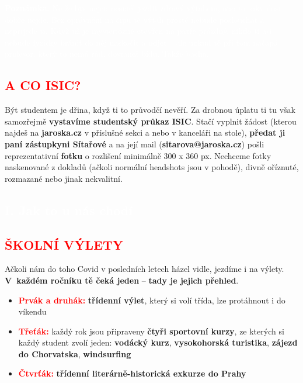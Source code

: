 \documentclass[a5paper, twoside]{article}
\newcommand{\polonadpis}[4]{
  \vspace*{-50pt}
  \begin{tcolorbox}[colback = #2, boxrule = 0pt, grow to left by = #4,  grow to right by = #4, arc=8pt, height = 30pt]
    \vspace*{5pt}
    \centering \subsection*{\textcolor{#3}{#1}}
  \end{tcolorbox}
}
\newcommand{\podnadpis}[2]{
  \subsection*{\textcolor{#2}{#1}}
}
\begin{document}
\begin{redbox}
	\textcolor{white}{\textbf{Poznámka.} Ne že bys nejen nesměl jezdit zdravý výtahem, ono to taky dost dobře nejde. Bez oprávnění na čipu tě výtah prostě nebude poslouchat a nepřijede ti. Když už je mysteriózně otevřen na patře prázdný, nikdo ti asi nebude fyzicky bránit do něj naskočit a odjet – ale pokud tě při tom načapá profesor, který to nemá rád, dostaneš bídu. Takže bacha.}
\end{redbox}

\podnadpis{A CO ISIC?}{red}
Být studentem je dřina, když ti to průvodčí nevěří. Za drobnou úplatu ti tu však samozřejmě \textbf{vystavíme studentský průkaz ISIC}. Stačí vyplnit žádost (kterou najdeš na {\bf jaroska.cz} v příslušné sekci a nebo v kanceláři na stole), \textbf{předat ji paní zástupkyni Sítařové} a na její mail (\textbf{sitarova@jaroska.cz}) pošli reprezentativní \textbf{fotku} o rozlišení minimálně 300 x 360 px. Nechceme fotky naskenované z dokladů (ačkoli normální headshots jsou v pohodě), divně oříznuté, rozmazané nebo jinak
nekvalitní.

\newpage

\polonadpis{I. Jak to u nás chodí}{red}{white}{-4.1cm}

\podnadpis{ŠKOLNÍ VÝLETY}{red}
Ačkoli nám do toho Covid v posledních letech házel vidle, jezdíme i na výlety.
\textbf{V~každém ročníku tě čeká jeden} -- \textbf{tady je jejich přehled}.

\begin{itemize}[leftmargin=10pt]
	\item \textcolor{red}{\textbf{Prvák a druhák:}} \textbf{třídenní výlet}, který si volí třída, lze protáhnout i do víkendu
	\item \textcolor{red}{\textbf{Třeťák:}} každý rok jsou připraveny \textbf{čtyři sportovní kurzy}, ze kterých si každý student zvolí jeden: \textbf{vodácký kurz}, \textbf{vysokohorská turistika}, \textbf{zájezd do Chorvatska}, \textbf{windsurfing}
	\item \textcolor{red}{\textbf{Čtvrťák:}} \textbf{třídenní literárně-historická exkurze do Prahy}
\end{itemize}
\end{document}
